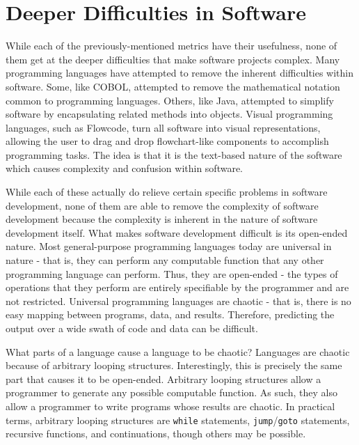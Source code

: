\section{Deeper Difficulties in Software}

While each of the previously-mentioned metrics have their usefulness, none of them get at the deeper difficulties that make software projects complex.  Many programming languages have attempted to remove the inherent difficulties within software.  Some, like COBOL, attempted to remove the mathematical notation common to programming languages.  Others, like Java, attempted to simplify software by encapsulating related methods into objects.  Visual programming languages, such as Flowcode, turn all software into visual representations, allowing the user to drag and drop flowchart-like components to accomplish programming tasks.  The idea is that it is the text-based nature of the software which causes complexity and confusion within software.

While each of these actually do relieve certain specific problems in software development, none of them are able to remove the complexity of software development because the complexity is inherent in the nature of software development itself.  What makes software development difficult is its open-ended nature.  Most general-purpose programming languages today are universal in nature - that is, they can perform any computable function that any other programming language can perform.  Thus, they are open-ended - the types of operations that they perform are entirely specifiable by the programmer and are not restricted.
Universal programming languages are chaotic - that is, there is no easy mapping between programs, data, and results.  Therefore, predicting the output over a wide swath of code and data can be difficult.  

What parts of a language cause a language to be chaotic?  Languages are chaotic because of arbitrary looping structures.  Interestingly, this is precisely the same part that causes it to be open-ended.  Arbitrary looping structures allow a programmer to generate any possible computable function.  As such, they also allow a programmer to write programs whose results are chaotic.  In practical terms, arbitrary looping structures are \verb+while+ statements, \verb+jump+/\verb+goto+ statements, recursive functions, and continuations, though others may be possible.

